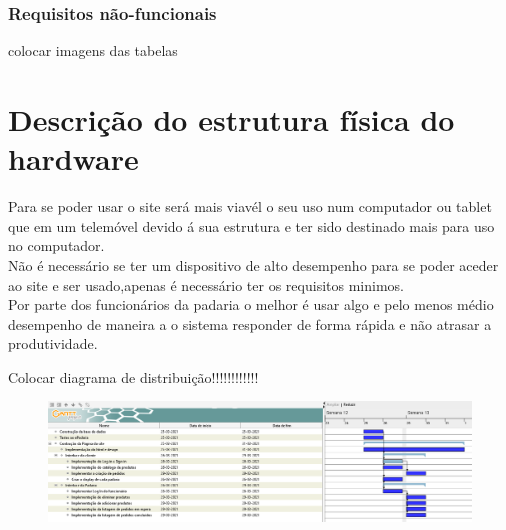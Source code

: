 \subsubsection{Requisitos não-funcionais}
colocar imagens das tabelas
\section{Descrição do estrutura física do hardware}
Para se poder usar o site será mais viavél o seu uso num computador ou tablet que em um telemóvel devido á sua estrutura e ter sido destinado mais para uso no computador. \\
Não é necessário se ter um dispositivo de alto desempenho para se poder aceder ao site e ser usado,apenas é necessário ter os requisitos minimos.\\
Por parte dos funcionários da padaria o melhor é usar algo e pelo menos médio desempenho de maneira a o sistema responder de forma rápida e não atrasar a produtividade.

Colocar diagrama de distribuição!!!!!!!!!!!!
\begin{figure}
	\includegraphics{gantt}
	\caption{}
	\label{fig:gantt}
\end{figure}





